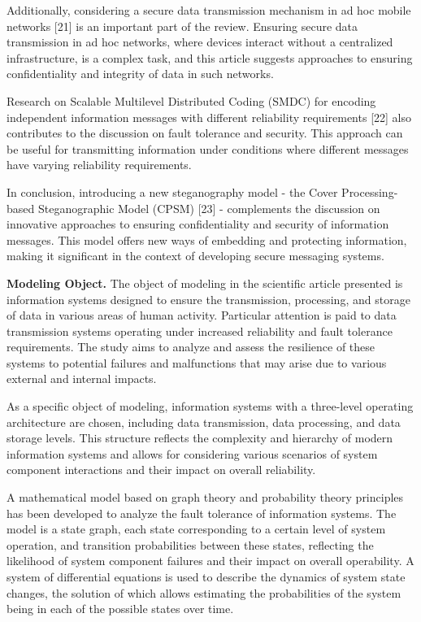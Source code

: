 Additionally, considering a secure data transmission mechanism in ad hoc
mobile networks {[}21{]} is an important part of the review. Ensuring
secure data transmission in ad hoc networks, where devices interact
without a centralized infrastructure, is a complex task, and this
article suggests approaches to ensuring confidentiality and integrity of
data in such networks.

Research on Scalable Multilevel Distributed Coding (SMDC) for encoding
independent information messages with different reliability requirements
{[}22{]} also contributes to the discussion on fault tolerance and
security. This approach can be useful for transmitting information under
conditions where different messages have varying reliability
requirements.

In conclusion, introducing a new steganography model - the Cover
Processing-based Steganographic Model (CPSM) {[}23{]} - complements the
discussion on innovative approaches to ensuring confidentiality and
security of information messages. This model offers new ways of
embedding and protecting information, making it significant in the
context of developing secure messaging systems.

\textbf{Modeling Object.} The object of modeling in the scientific
article presented is information systems designed to ensure the
transmission, processing, and storage of data in various areas of human
activity. Particular attention is paid to data transmission systems
operating under increased reliability and fault tolerance requirements.
The study aims to analyze and assess the resilience of these systems to
potential failures and malfunctions that may arise due to various
external and internal impacts.

As a specific object of modeling, information systems with a three-level
operating architecture are chosen, including data transmission, data
processing, and data storage levels. This structure reflects the
complexity and hierarchy of modern information systems and allows for
considering various scenarios of system component interactions and their
impact on overall reliability.

A mathematical model based on graph theory and probability theory
principles has been developed to analyze the fault tolerance of
information systems. The model is a state graph, each state
corresponding to a certain level of system operation, and transition
probabilities between these states, reflecting the likelihood of system
component failures and their impact on overall operability. A system of
differential equations is used to describe the dynamics of system state
changes, the solution of which allows estimating the probabilities of
the system being in each of the possible states over time.

